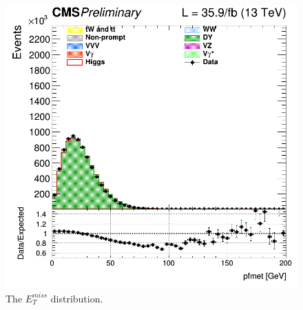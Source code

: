 \begin{figure}
\centering
\includegraphics[scale= 0.3]{../Cap4/Figs/MET/cratio_met_13TeV_of_metPftype1.png}
\caption{ The  $E_T^{miss}$ distribution. }
\label{met}
\end{figure}


